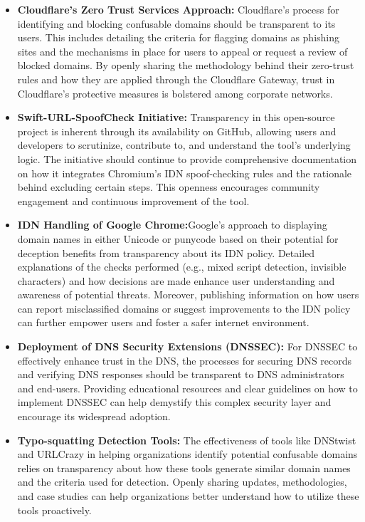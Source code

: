 \begin{itemize}
  \item \textbf{Cloudflare's Zero Trust Services Approach: } Cloudflare's process for identifying and blocking confusable domains should be transparent to its users. This includes detailing the criteria for flagging domains as phishing sites and the mechanisms in place for users to appeal or request a review of blocked domains. By openly sharing the methodology behind their zero-trust rules and how they are applied through the Cloudflare Gateway, trust in Cloudflare's protective measures is bolstered among corporate networks.
  
  \item \textbf{Swift-URL-SpoofCheck Initiative:} Transparency in this open-source project is inherent through its availability on GitHub, allowing users and developers to scrutinize, contribute to, and understand the tool's underlying logic. The initiative should continue to provide comprehensive documentation on how it integrates Chromium's IDN spoof-checking rules and the rationale behind excluding certain steps. This openness encourages community engagement and continuous improvement of the tool.
  
  \item \textbf{IDN Handling of Google Chrome:}Google's approach to displaying domain names in either Unicode or punycode based on their potential for deception benefits from transparency about its IDN policy. Detailed explanations of the checks performed (e.g., mixed script detection, invisible characters) and how decisions are made enhance user understanding and awareness of potential threats. Moreover, publishing information on how users can report misclassified domains or suggest improvements to the IDN policy can further empower users and foster a safer internet environment.
  
  \item \textbf{Deployment of DNS Security Extensions (DNSSEC): }For DNSSEC to effectively enhance trust in the DNS, the processes for securing DNS records and verifying DNS responses should be transparent to DNS administrators and end-users. Providing educational resources and clear guidelines on how to implement DNSSEC can help demystify this complex security layer and encourage its widespread adoption.
  
  \item \textbf{Typo-squatting Detection Tools: }The effectiveness of tools like DNStwist and URLCrazy in helping organizations identify potential confusable domains relies on transparency about how these tools generate similar domain names and the criteria used for detection. Openly sharing updates, methodologies, and case studies can help organizations better understand how to utilize these tools proactively.
  

\end{itemize}
